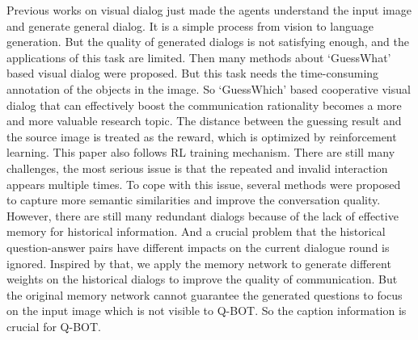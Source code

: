 \documentclass[review]{elsarticle}
\begin{document}
	Previous works \cite{DBLP:conf/cvpr/DasKGSYMPB17, guo2019dual} on visual dialog just made the agents understand the input image and generate general dialog. It is a simple process from vision to language generation.
	But the quality of generated dialogs is not satisfying enough, and the applications of this task are limited.
	Then many methods \cite{DBLP:conf/coling/ShekharBVBBF18, DBLP:conf/naacl/ShekharVBBPBF19} about `GuessWhat' based visual dialog were proposed. 
	But this task needs the time-consuming annotation of the objects in the image.
	So `GuessWhich' based cooperative visual dialog \cite{DBLP:conf/iccv/DasKMLB17} that can effectively boost the communication rationality becomes a more and more valuable research topic. 
	The distance between the guessing result and the source image is treated as the reward, which is optimized by reinforcement learning. This paper also follows RL training mechanism. 
	There are still many challenges, the most serious issue is that the repeated and invalid interaction appears multiple times. To cope with this issue, several methods \cite{DBLP:conf/nips/LuKYPB17, DBLP:conf/atal/AgarwalGSLS19, DBLP:conf/sigdial/ZhangZY18, DBLP:conf/emnlp/MurahariCBPD19} were proposed to capture more semantic similarities and improve the conversation quality. 
	However, there are still many redundant dialogs because of the lack of effective memory for historical information. And a crucial problem that the historical question-answer pairs have different impacts on the current dialogue round is ignored. Inspired by that, we apply the memory network to generate different weights on the historical dialogs to improve the quality of communication. But the original memory network cannot guarantee the generated questions to focus on the input image which is not visible to Q-BOT. So the caption information is crucial for Q-BOT.
	
\end{document}
